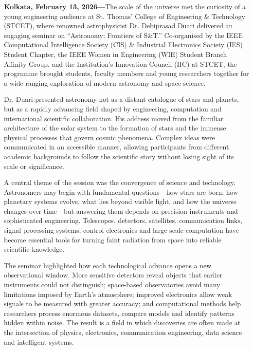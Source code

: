 {\small
\noindent
\textbf{Kolkata, February 13, 2026---}The scale of the universe met the curiosity of a young engineering audience at St. Thomas' College of Engineering \& Technology (STCET), where renowned astrophysicist Dr. Debiprasad Duari delivered an engaging seminar on ``Astronomy: Frontiers of S\&T.'' Co-organised by the IEEE Computational Intelligence Society (CIS) \& Industrial Electronics Society (IES) Student Chapter, the IEEE Women in Engineering (WIE) Student Branch Affinity Group, and the Institution's Innovation Council (IIC) at STCET, the programme brought students, faculty members and young researchers together for a wide-ranging exploration of modern astronomy and space science.

\medskip
\noindent
Dr. Duari presented astronomy not as a distant catalogue of stars and planets, but as a rapidly advancing field shaped by engineering, computation and international scientific collaboration. His address moved from the familiar architecture of the solar system to the formation of stars and the immense physical processes that govern cosmic phenomena. Complex ideas were communicated in an accessible manner, allowing participants from different academic backgrounds to follow the scientific story without losing sight of its scale or significance.

\medskip
\noindent
A central theme of the session was the convergence of science and technology. Astronomers may begin with fundamental questions---how stars are born, how planetary systems evolve, what lies beyond visible light, and how the universe changes over time---but answering them depends on precision instruments and sophisticated engineering. Telescopes, detectors, satellites, communication links, signal-processing systems, control electronics and large-scale computation have become essential tools for turning faint radiation from space into reliable scientific knowledge.

\medskip
\noindent
The seminar highlighted how each technological advance opens a new observational window. More sensitive detectors reveal objects that earlier instruments could not distinguish; space-based observatories avoid many limitations imposed by Earth's atmosphere; improved electronics allow weak signals to be measured with greater accuracy; and computational methods help researchers process enormous datasets, compare models and identify patterns hidden within noise. The result is a field in which discoveries are often made at the intersection of physics, electronics, communication engineering, data science and intelligent systems.

}
